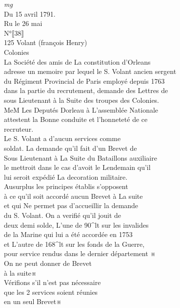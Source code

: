 \documentclass{article}
\begin{document}
\begin{pages}
\vspace{0.5cm}\noindent
\textit{mg}
\footnotesize \\
Du 15 avril 1791.\\
Ru le 26 mai\\
N°⟦38⟧\\
125
\normalsize \pstart
Volant (françois Henry)\\
Colonies\\
La Société des amis de La constitution d'Orleans\\
adresse un memoire par lequel le S. Volant ancien sergent\\
du Régiment Provincial de Paris employé depuis 1763\\
dans la partie du recrutement, demande des Lettres de\\
sous Lieutenant à la Suite des troupes des Colonies.\\
MeM Les Deputés Dorleau à L'assemblée Nationale\\
attestent la Bonne conduite et l'honneteté de ce\\
recruteur.\\
Le S. Volant a d'aucun services comme\\
soldat. La demande qu'il fait d'un Brevet de\\
Sous Lieutenant à La Suite du Bataillons auxiliaire\\
le mettroit dans le cas d'avoit le Lendemain qu'il\\
lui seroit expédié La decoration militaire.\\
Ausurplus les principes établis s'opposent\\
à ce qu'il soit accordé aucun Brevet à La suite\\
et qui Ne permet pas d'accueillir la demande\\
du S. Volant. On a verifié qu'il jouit de\\
deux demi solde, L'une de 90\^{}lt sur les invalides\\
de la Marine qui lui a été accordée en 1753\\
et L'autre de 168\^{}lt sur les fonds de la Guerre,\\
pour service rendus dans le dernier département ※\\
On ne peut donner de Brevet\\
à la suite※\\
Vérifions s'il n'est pas nécessaire\\
que les 2 services soient réunies\\
en un seul Brevet※
\pend

\end{pages}
\end{document}
